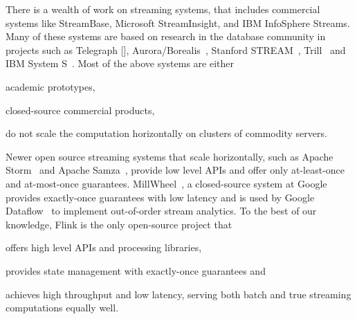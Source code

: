  There is a wealth of work on streaming systems, that includes commercial systems like StreamBase, Microsoft StreamInsight, and IBM InfoSphere Streams. Many of these systems are based on research in the database community in projects such as Telegraph [], Aurora/Borealis~\cite{abadi2005design}, Stanford STREAM~\cite{arasu2004stream}, Trill~\cite{chandramouli2014trill} and IBM System S~\cite{chandramouli2014trill}. Most of the above systems are either
\begin{inparaenum}[i)]
  \item academic prototypes,
  \item closed-source commercial products,
  \item do not scale the computation horizontally on clusters of commodity servers.
\end{inparaenum}
Newer open source streaming systems that scale horizontally, such as Apache Storm~\cite{CUSTOM:web/Storm} and Apache Samza~\cite{CUSTOM:web/Samza}, provide low level APIs and offer only at-least-once and at-most-once guarantees. MillWheel~\cite{akidau2013millwheel}, a closed-source system at Google provides exactly-once guarantees with low latency and is used by Google Dataflow~\cite{akidau2015dataflow} to implement  out-of-order stream analytics. To the best of our knowledge, Flink is the only open-source project that
\begin{inparaenum}[i)]
  \item offers high level APIs and processing libraries,
  \item provides state management with exactly-once guarantees and
  \item achieves high throughput and low latency, serving both batch and true streaming computations equally well.
\end{inparaenum}